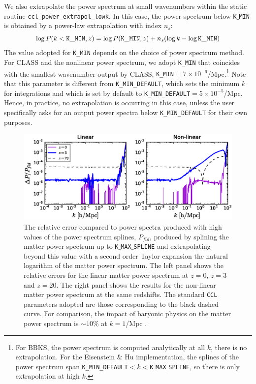 \documentclass[\docopts]{\docclass}
\newcommand{\ccl}{{\tt CCL}\xspace}
\begin{document}
We also extrapolate the power spectrum at small wavenumbers within the static routine {\tt ccl\_power\_extrapol\_lowk}. In this case, the power spectrum below {\tt K$\_$MIN} is obtained by a power-law extrapolation with index $n_s$:
\begin{equation}
  \log P(k<{\tt K\_MIN},z) = \log P({\tt K\_MIN},z) + n_s (\log k-\log{\tt K\_MIN})
\end{equation}
The value adopted for {\tt K\_MIN} depends on the choice of power spectrum method. For CLASS and the nonlinear power spectrum, we adopt {\tt K\_MIN} that coincides with the smallest wavenumber output by CLASS, {\tt K\_MIN}$=7\times 10^{-6}$/Mpc.\footnote{For BBKS, the power spectrum is computed analytically at all $k$, there is no extrapolation. For the Eisenstein \& Hu implementation, the splines of the power spectrum span {\tt K\_MIN\_DEFAULT}$<k<${\tt K$\_$MAX$\_$SPLINE}, so there is only extrapolation at high $k$.} Note that this parameter is different from {\tt K\_MIN\_DEFAULT}, which sets the minimum $k$ for integrations and which is set by default to {\tt K\_MIN\_DEFAULT}$=5\times 10^{-5}$/Mpc. Hence, in practice, no extrapolation is occurring in this case, unless the user specifically asks for an output power spectra below {\tt K\_MIN\_DEFAULT} for their own purposes.


\begin{figure}
\centering
\includegraphics[width=1.0\textwidth]{plot_power.eps}
\caption{The relative error compared to power spectra produced with high values of the power spectrum splines, $P_{fid}$, produced by splining the matter power spectrum up to {\tt K$\_$MAX$\_$SPLINE} and extrapolating beyond this value with a second order Taylor expansion the natural logarithm of the matter power spectrum. The left panel shows the relative errors for the linear matter power spectrum at $z=0$, $z=3$ and $z=20$. The right panel shows the results for the non-linear matter power spectrum at the same redshifts. The standard \ccl parameters adopted are those corresponding to the black dashed curve. For comparison, the impact of baryonic physics on the matter power spectrum is $\sim 10\%$ at $k=1$/Mpc \citep{Schneider15}.}
\label{fig:NLextrapol}
\end{figure}
\end{document}
